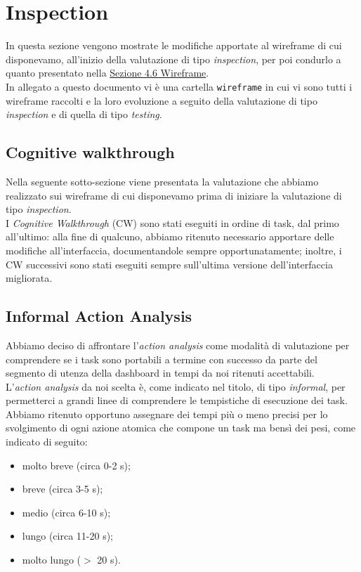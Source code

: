 \section{Inspection}
\label{s:inspection}

In questa sezione vengono mostrate le modifiche apportate al wireframe di cui disponevamo, all'inizio della valutazione di tipo \textit{inspection}, per poi condurlo a quanto presentato nella \hyperref[s:wireframe]{Sezione 4.6 Wireframe}.\\
In allegato a questo documento vi è una cartella \texttt{wireframe} in cui vi sono tutti i wireframe raccolti e la loro evoluzione a seguito della valutazione di tipo \textit{inspection} e di quella di tipo \textit{testing}.

\subsection{Cognitive walkthrough}
\label{ss:cognitive-walkthrough}

Nella seguente sotto-sezione viene presentata la valutazione che abbiamo realizzato sui wireframe di cui disponevamo prima di iniziare la valutazione di tipo \textit{inspection}.\\
I \textit{Cognitive Walkthrough} (CW) sono stati eseguiti in ordine di task, dal primo all'ultimo: alla fine di qualcuno, abbiamo ritenuto necessario apportare delle modifiche all'interfaccia, documentandole sempre opportunatamente; inoltre, i CW successivi sono stati eseguiti sempre sull'ultima versione dell'interfaccia migliorata.








\subsection{Informal Action Analysis}
\label{ss:informal-action-analysis}
Abbiamo deciso di affrontare l'\textit{action analysis} come modalità di valutazione per comprendere se i task sono portabili a termine con successo da parte del segmento di utenza della dashboard in tempi da noi ritenuti accettabili.\\
L'\textit{action analysis} da noi scelta è, come indicato nel titolo, di tipo \textit{informal}, per permetterci a grandi linee di comprendere le tempistiche di esecuzione dei task.\\
Abbiamo ritenuto opportuno assegnare dei tempi più o meno precisi per lo svolgimento di ogni azione atomica che compone un task ma bensì dei pesi, come indicato di seguito:
\begin{itemize}
    \item molto breve (circa 0-2 s);
    \item breve (circa 3-5 s);
    \item medio (circa 6-10 s);
    \item lungo (circa 11-20 s);
    \item molto lungo ($>$ 20 s).
\end{itemize}

